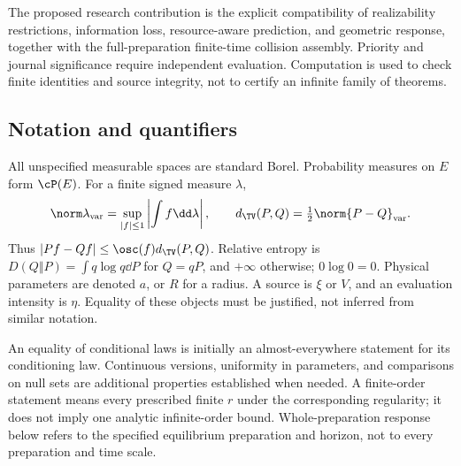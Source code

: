 The proposed research contribution is the explicit compatibility of realizability restrictions, information loss, resource-aware prediction, and geometric response, together with the full-preparation finite-time collision assembly. Priority and journal significance require independent evaluation. Computation is used to check finite identities and source integrity, not to certify an infinite family of theorems.

\subsection{Notation and quantifiers}
All unspecified measurable spaces are standard Borel. Probability measures on $E$ form $\cP(E)$. For a finite signed measure $\lambda$,
\[
 \norm\lambda_{\rm var}=\sup_{|f|\le1}\left|\int f\dd\lambda\right|,
 \qquad d_{\TV}(P,Q)=\tfrac12\norm{P-Q}_{\rm var}.
\]
Thus $|Pf-Qf|\le\osc(f)d_{\TV}(P,Q)$. Relative entropy is
$D(Q\Vert P)=\int q\log q\dd P$ for $Q=qP$, and $+\infty$ otherwise; $0\log0=0$. Physical parameters are denoted $a$, or $R$ for a radius. A source is $\xi$ or $V$, and an evaluation intensity is $\eta$. Equality of these objects must be justified, not inferred from similar notation.

An equality of conditional laws is initially an almost-everywhere statement for its conditioning law. Continuous versions, uniformity in parameters, and comparisons on null sets are additional properties established when needed. A finite-order statement means every prescribed finite $r$ under the corresponding regularity; it does not imply one analytic infinite-order bound. Whole-preparation response below refers to the specified equilibrium preparation and horizon, not to every preparation and time scale.
\par

